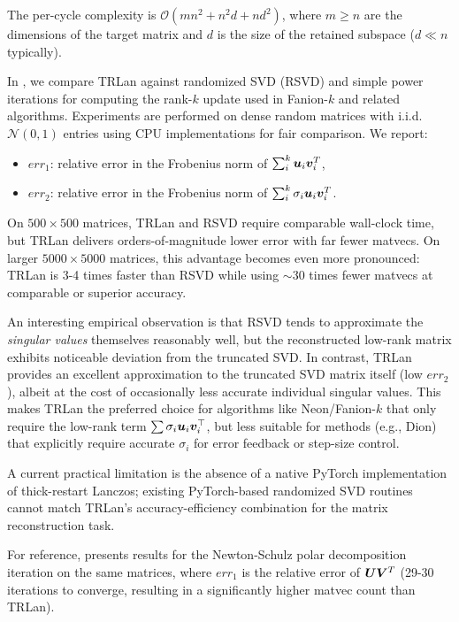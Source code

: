 \documentclass[pmlr]{jmlr}%
\begin{document}
 The per-cycle complexity is $\mathcal{O}(mn^2 + n^2d + nd^2)$, where $m \geq n$ are the dimensions of the target matrix and $d$ is the size of the retained subspace ($d \ll n$ typically).
 
 In , we compare TRLan against randomized SVD (RSVD) and simple power iterations for computing the rank-$k$ update used in Fanion-$k$ and related algorithms. Experiments are performed on dense random matrices with i.i.d. $\mathcal{N}(0,1)$ entries using CPU implementations for fair comparison.
 We report:
 \begin{itemize}
   \item $err_1$: relative error in the Frobenius norm of $\sum_i^k {\bm{u}}_i {\bm{v}}_i^T$,
   \item $err_2$: relative error in the Frobenius norm of $\sum_i^k \sigma_i {\bm{u}}_i {\bm{v}}_i^T$.
 \end{itemize}
 
 On $500\times500$ matrices, TRLan and RSVD require comparable wall-clock time, but TRLan delivers orders-of-magnitude lower error with far fewer matvecs. On larger $5000\times5000$ matrices, this advantage becomes even more pronounced: TRLan is 3-4 times faster than RSVD while using $\sim$30 times fewer matvecs at comparable or superior accuracy.
 
 An interesting empirical observation is that RSVD tends to approximate the \emph{singular values} themselves reasonably well, but the reconstructed low-rank matrix exhibits noticeable deviation from the truncated SVD. In contrast, TRLan provides an excellent approximation to the truncated SVD matrix itself (low $err_2$), albeit at the cost of occasionally less accurate individual singular values. This makes TRLan the preferred choice for algorithms like Neon/Fanion-$k$ that only require the low-rank term $\sum \sigma_i {\bm{u}}_i {\bm{v}}_i^\top$, but less suitable for methods (e.g., Dion) that explicitly require accurate $\sigma_i$ for error feedback or step-size control.
 
 A current practical limitation is the absence of a native PyTorch implementation of thick-restart Lanczos; existing PyTorch-based randomized SVD routines cannot match TRLan's accuracy-efficiency combination for the matrix reconstruction task.
 
 For reference,  presents results for the Newton-Schulz polar decomposition iteration on the same matrices, where $err_1$ is the relative error of ${\bm{U}}{\bm{V}}^T$ (29-30 iterations to converge, resulting in a significantly higher matvec count than TRLan).
 
\end{document}
